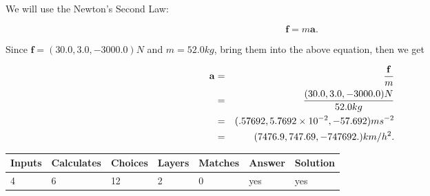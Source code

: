 \documentclass[12pt]{article}
\begin{document}
 
\noindent{}
 
 
 
 
 
 
\noindent{}
 
 

We will use the Newton's Second Law:
 
\[
\mathbf{f}=m\mathbf{a}.
\]
 
Since $\mathbf{f}=( %
30.0,  %
3.0,  %
-3000.0 )N$
and $m= %
52.0 kg$, bring them into the above equation, then we get
 
\begin{eqnarray*}
\mathbf{a}&=&\frac{\mathbf{f}}m  \\
&=&\frac{(
30.0 ,
3.0 ,
-3000.0 )N
}{ %
52.0 kg}  \\
&=&(
.57692 ,
5.7692 \times 10^{-2},
-57.692
)ms^{-2} \\
&=&(
7476.9 ,
747.69 ,
-747692.
)km/h^2.
\end{eqnarray*}
 
 
 
\noindent{}
 
 

 
 
\vspace{0.3in}
   
   
   
   
\noindent\begin{tabular}{|l|l|l|l|l|l|l|}
 \hline
Inputs & Calculates & Choices & Layers & Matches & Answer & Solution \\ \hline
           4 & 
           6 & 
          12
  & 
           2 & 
           0 & 
  yes & 
  yes 
  \\ \hline
 \end{tabular}
   
   
   
   
\noindent{}
   
   
  
\end{document}

